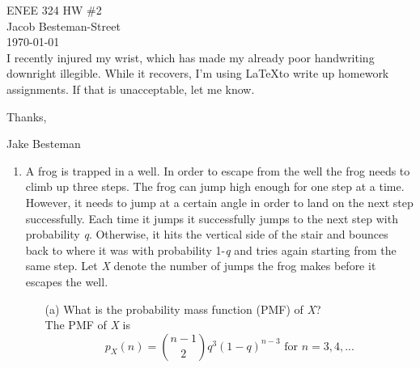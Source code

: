 \documentclass{report}
\begin{document}
ENEE 324 HW \#2 \\
Jacob Besteman-Street \\
\today \\

I recently injured my wrist, which has made my already poor handwriting downright illegible.
While it recovers, I'm using \LaTeX to write up homework assignments. If that is unacceptable, let me know.

Thanks,

Jake Besteman

\begin{enumerate}
\item A frog is trapped in a well.  In order to escape from the well the frog needs to climb up three steps.
The frog can jump high enough for one step at a time.
However, it needs to jump at a certain angle in order to land on the next step successfully.
Each time it jumps it successfully jumps to the next step with probability \textit{q}.
 Otherwise, it hits the vertical side of the stair and bounces back to where it was
 with probability 1-\textit{q} and tries again starting from the same step.  Let \textit{X}
 denote the number of jumps the frog makes before it escapes the well.

\begin{itemize}
\item[(a)] What is the probability mass function (PMF) of \textit{X}?\\ \newline
The PMF of \textit{X} is $$p_X(n) = \binom{n-1}{2}q^3(1-q)^{n-3} \text{ for } n = 3, 4, ...       $$



\end{itemize}
\end{enumerate}
\end{document}
